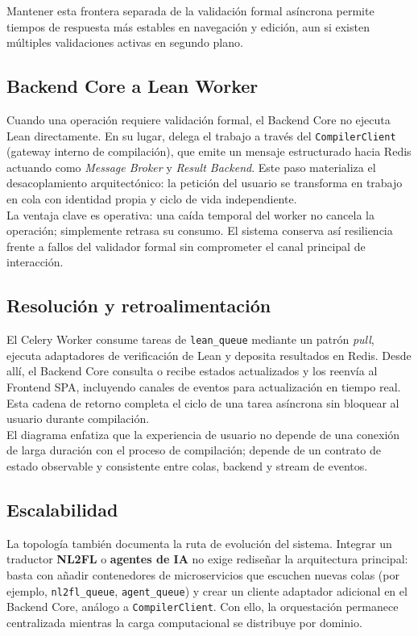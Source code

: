 \documentclass[12pt, letterpaper]{article}
\begin{document}
Mantener esta frontera separada de la validación formal asíncrona permite tiempos de respuesta más estables en navegación y edición, aun si existen múltiples validaciones activas en segundo plano.

\subsection{Backend Core a Lean Worker}

Cuando una operación requiere validación formal, el Backend Core no ejecuta Lean directamente. En su lugar, delega el trabajo a través del \texttt{CompilerClient} (gateway interno de compilación), que emite un mensaje estructurado hacia Redis actuando como \textit{Message Broker} y \textit{Result Backend}. Este paso materializa el desacoplamiento arquitectónico: la petición del usuario se transforma en trabajo en cola con identidad propia y ciclo de vida independiente.\\

La ventaja clave es operativa: una caída temporal del worker no cancela la operación; simplemente retrasa su consumo. El sistema conserva así resiliencia frente a fallos del validador formal sin comprometer el canal principal de interacción.

\subsection{Resolución y retroalimentación}

El Celery Worker consume tareas de \texttt{lean\_queue} mediante un patrón \textit{pull}, ejecuta adaptadores de verificación de Lean y deposita resultados en Redis. Desde allí, el Backend Core consulta o recibe estados actualizados y los reenvía al Frontend SPA, incluyendo canales de eventos para actualización en tiempo real. Esta cadena de retorno completa el ciclo de una tarea asíncrona sin bloquear al usuario durante compilación.\\

El diagrama enfatiza que la experiencia de usuario no depende de una conexión de larga duración con el proceso de compilación; depende de un contrato de estado observable y consistente entre colas, backend y stream de eventos.

\subsection{Escalabilidad}

La topología también documenta la ruta de evolución del sistema. Integrar un traductor \textbf{NL2FL} o \textbf{agentes de IA} no exige rediseñar la arquitectura principal: basta con añadir contenedores de microservicios que escuchen nuevas colas (por ejemplo, \texttt{nl2fl\_queue}, \texttt{agent\_queue}) y crear un cliente adaptador adicional en el Backend Core, análogo a \texttt{CompilerClient}. Con ello, la orquestación permanece centralizada mientras la carga computacional se distribuye por dominio.\\
\end{document}
